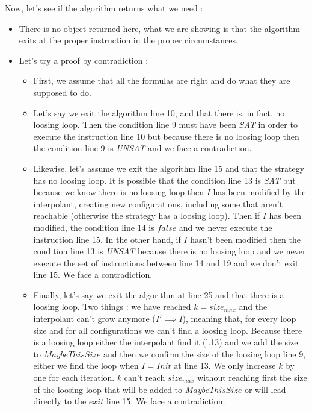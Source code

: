 \documentclass{article}
\begin{document}
\noindent Now, let's see if the algorithm returns what we need :
\begin{itemize}
    \item There is no object returned here, what we are showing is that the algorithm exits at the proper instruction in the proper circumstances.
    \item Let's try a proof by contradiction :
    \begin{itemize}
        \item First, we assume that all the formulas are right and do what they are supposed to do.
        \item Let's say we exit the algorithm line 10, and that there is, in fact, no loosing loop. Then the condition line 9 must have been \textit{SAT} in order to execute the instruction line 10 but because there is no loosing loop then the condition line 9 is \textit{UNSAT} and we face a contradiction.
        \item Likewise, let's assume we exit the algorithm line 15 and that the strategy has no loosing loop. It is possible that the condition line 13 is \textit{SAT} but because we know there is no loosing loop then $I$ has been modified by the interpolant, creating new configurations, including some that aren't reachable (otherwise the strategy has a loosing loop). Then if $I$ has been modified, the condition line 14 is $false$ and we never execute the instruction line 15. In the other hand, if $I$ hasn't been modified then the condition line 13 is \textit{UNSAT} because there is no loosing loop and we never execute the set of instructions between line 14 and 19 and we don't exit line 15. We face a contradiction.
        \item Finally, let's say we exit the algorithm at line 25 and that there is a loosing loop. Two things : we have reached $k = size_{max}$ and the interpolant can't grow anymore ($I' \implies I$), meaning that, for every loop size and for all configurations we can't find a loosing loop. Because there is a loosing loop either the interpolant find it (l.13) and we add the size to $MaybeThisSize$ and then we confirm the size of the loosing loop line 9, either we find the loop when $I = Init$ at line 13. We only increase $k$ by one for each iteration. $k$ can't reach $size_{max}$ without reaching first the size of the loosing loop that will be added to $MaybeThisSize$ or will lead directly to the $exit$ line 15. We face a contradiction.
    \end{itemize}
\end{itemize}
\end{document}
